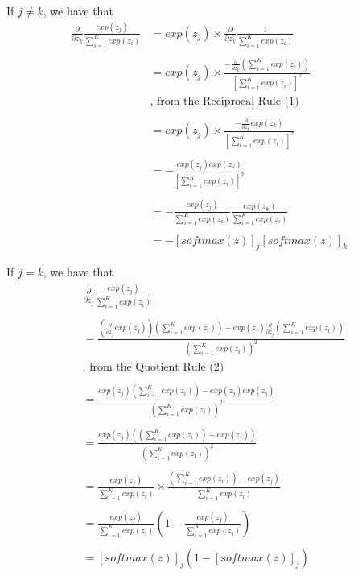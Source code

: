 \documentclass[10pt]{article}
\begin{document}
If $j \neq k$, we have that
\begin{equation}
\begin{aligned}
  \frac{\partial}{\partial z_{k}} \frac{exp(z_{j})}{\sum_{i=1}^{K} exp(z_{i})} {} & = exp(z_{j}) \times \frac{\partial}{\partial z_{k}}\frac{1}{\sum_{i=1}^{K} exp(z_{i})}
  \\ \\ &
  = exp(z_{j}) \times \frac{-\frac{\partial}{\partial z_{k}}\left(\sum_{i=1}^{K} exp(z_{i})\right)}{\left[\sum_{i=1}^{K} exp(z_{i})\right]^{2}} \\
		&\text{, from the Reciprocal Rule (1)}
  \\ \\ &
  = exp(z_{j}) \times \frac{-\frac{\partial}{\partial z_{k}}exp(z_{k})}{\left[\sum_{i=1}^{K} exp(z_{i})\right]^{2}}
  \\ \\ &
  = -\frac{exp(z_{j})exp(z_{k})}{\left[\sum_{i=1}^{K} exp(z_{i})\right]^{2}}
  \\ \\ &
  = -\frac{exp(z_{j})}{\sum_{i=1}^{K} exp(z_{i})}\frac{exp(z_{k})}{\sum_{i=1}^{K} exp(z_{i})}
  \\ \\ &
  = -[softmax(z)]_{j} [softmax(z)]_{k}
\end{aligned}
\end{equation}

If $j = k$, we have that
\begin{equation}
\begin{aligned}
  &\frac{\partial}{\partial z_{j}} \frac{exp(z_{j})}{\sum_{i=1}^{K} exp(z_{i})} {}\\ \\
  &= \frac
	{\left( \frac{\partial}{\partial z_{j}} exp(z_{j}) \right) \left(\sum_{i=1}^{K} exp(z_{i}) \right) - exp(z_{j}) \frac{\partial}{\partial z_{j}} \left(\sum_{i=1}^{K} exp(z_{i}) \right)}
  {\left(\sum_{i=1}^{K} exp(z_{i}) \right)^{2}} \\&\text{, from the Quotient Rule (2)} \\ \\
																				  &= \frac
	{exp(z_{j})\left(\sum_{i=1}^{K} exp(z_{i}) \right) - exp(z_j)exp(z_j)}
	{\left(\sum_{i=1}^{K} exp(z_{i}) \right)^{2}} \\ \\
																				  &= \frac
	{exp(z_{j}) \left(\left(\sum_{i=1}^{K} exp(z_{i}) \right) - exp(z_j) \right)}
	{\left(\sum_{i=1}^{K} exp(z_{i}) \right) ^{2}} \\ \\
																				  &= \frac{exp(z_{j})}{\sum_{i=1}^{K} exp(z_{i})} \times
  \frac{\left(\sum_{i=1}^{K} exp(z_{i}) \right) - exp(z_j)}{\sum_{i=1}^{K} exp(z_{i})} \\ \\
																				  &= \frac{exp(z_{j})}{\sum_{i=1}^{K} exp(z_{i})}\left(1-
  \frac{exp(z_j)}{\sum_{i=1}^{K} exp(z_{i})}\right) \\ \\
																				  &= [softmax(z)]_{j} (1 - [softmax(z)]_{j})
\end{aligned}
\end{equation}
\end{document}
